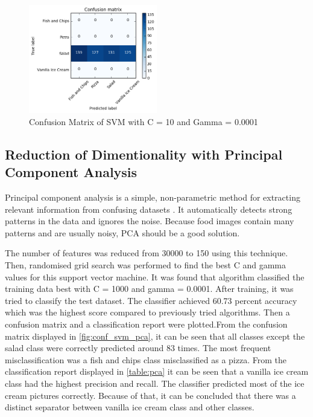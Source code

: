 \begin{figure}[h]
\centering
\includegraphics[width=0.5\textwidth]{Figures/svm2.png}
\caption{Confusion Matrix of SVM with C = 10 and Gamma = 0.0001}
\label{fig:svd}
\end{figure}


\subsection{Reduction of  Dimentionality with Principal Component Analysis}
Principal component analysis is a simple, non-parametric method for extracting relevant information from confusing datasets \citep{pca}. It automatically detects strong patterns in the data and ignores the noise. Because food images contain many patterns and are usually noisy, PCA should be a good solution.  

The number of features was reduced from 30000 to 150 using this technique. Then, randomised grid search was performed to find the best C and gamma values for this support vector machine. 
It was found that algorithm classified the training data best with C = 1000 and gamma = 0.0001. After training, it was tried to classify the test dataset. The classifier achieved 60.73 percent accuracy which was the highest score compared to previously tried algorithms. Then a  confusion matrix and a classification report were plotted.From the confusion matrix displayed in \autoref{fig:conf_svm_pca}, it can be seen that all classes except the salad class were correctly predicted around 83 times. The most frequent misclassification was a fish and chips class misclassified as a pizza. From the classification report displayed in    \autoref{table:pca} it can be seen that a vanilla ice cream class had the highest precision and recall. The classifier predicted most of the ice cream pictures correctly. Because of that, it can be concluded that there was a distinct separator between vanilla ice cream class and other classes.

